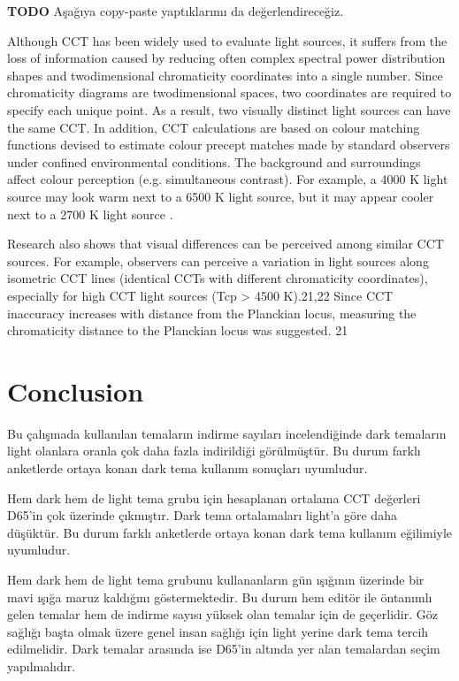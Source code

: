 \documentclass{article}
\begin{document}
\textbf{TODO} Aşağıya copy-paste yaptıklarımı da değerlendireceğiz.

Although CCT has been widely used to evaluate light sources, it suffers from the loss of information caused by reducing often complex spectral power distribution shapes and twodimensional chromaticity coordinates into a single number. Since chromaticity diagrams are twodimensional spaces, two coordinates are required to specify each unique point. As a result, two visually distinct light sources can have the same CCT. In addition, CCT calculations are based on colour matching functions devised to estimate colour precept matches made by standard observers under confined environmental conditions. The background and surroundings affect colour perception (e.g. simultaneous contrast). For example, a 4000 K light source may look warm next to a 6500 K light source, but it may appear cooler next to a 2700 K light source \cite{durmus2021correlated}.

Research also shows that visual differences can be perceived among similar CCT sources. For example, observers can perceive a variation in light sources along isometric CCT lines (identical CCTs with different chromaticity coordinates), especially for high CCT light sources (Tcp > 4500 K).21,22 Since CCT inaccuracy increases with distance from the Planckian locus, measuring the chromaticity distance to the Planckian locus was suggested. 21\cite{durmus2021correlated}

\section{Conclusion}
Bu çalışmada kullanılan temaların indirme sayıları incelendiğinde dark temaların light olanlara oranla çok daha fazla indirildiği görülmüştür. Bu durum farklı anketlerde ortaya konan dark tema kullanım sonuçları uyumludur.

Hem dark hem de light tema grubu için hesaplanan ortalama CCT değerleri D65'in çok üzerinde çıkmıştır. Dark tema ortalamaları light'a göre daha düşüktür. Bu durum farklı anketlerde ortaya konan dark tema kullanım eğilimiyle uyumludur.

Hem dark hem de light tema grubunu kullananların gün ışığının üzerinde bir mavi ışığa maruz kaldığını göstermektedir. Bu
durum hem editör ile öntanımlı gelen temalar hem de indirme sayısı yüksek olan temalar için de geçerlidir. Göz sağlığı
başta olmak üzere genel insan sağlığı için light yerine dark tema tercih edilmelidir. Dark temalar arasında ise D65'in
altında yer alan temalardan seçim yapılmalıdır.
\end{document}
